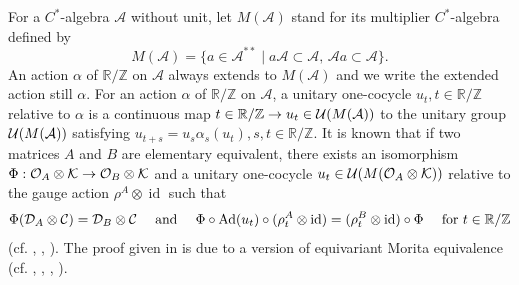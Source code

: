 \documentclass[11pt]{article}
\theoremstyle{plain}
\theoremstyle{definition}
\numberwithin{equation}{section}
\newcommand{\id}{\operatorname{id}}
\newcommand{\Ad}{\operatorname{Ad}}
\newcommand{\RZ}{\mathbb{R}/{\mathbb{Z}}}
\begin{document}
For a $C^*$-algebra $\mathcal{A}$ without unit,
let $M({\mathcal{A}})$ stand for its multiplier $C^*$-algebra
defined by 
\begin{equation*}
M({\mathcal{A}}) = \{ a \in {\mathcal{A}}^{**} 
\mid a {\mathcal{A}} \subset {\mathcal{A}}, \, 
    {\mathcal{A}} a \subset {\mathcal{A}} \}. 
\end{equation*}
An action $\alpha$ of $\RZ$ on $\mathcal{A}$ always extends to 
  $M({\mathcal{A}})$ and we write the extended action still $\alpha$.
For an action $\alpha$ of $\RZ$ on ${\mathcal{A}}$,
a unitary one-cocycle $u_t, t \in \RZ$ relative to $\alpha$
is a continuous map $t \in \RZ \rightarrow u_t \in \U(M({\mathcal{A}}))$
to the unitary group  ${{\mathcal{U}}}(M({\mathcal{A}}))$ 
satisfying
$u_{t+s} = u_s \alpha_s(u_t), s,t \in \RZ$.
It is known that
if two matrices $A$ and $B$ are elementary equivalent,
there exists an isomorphism
$\Phi:{{\mathcal{O}}_A}\otimes{\mathcal{K}} \rightarrow {{\mathcal{O}}_B}\otimes{\mathcal{K}}$ 
and  a unitary one-cocycle
$u_t \in {{\mathcal{U}}}(M({{\mathcal{O}}_A}\otimes{\mathcal{K}}))$ relative to the gauge action
$\rho^{A} \otimes\id$
such that 
\begin{equation*}
\Phi(\SDA) = \SDB
\quad
\text{ and }
\quad
\Phi \circ \Ad(u_t) \circ (\rho^{A}_t\otimes \id)
 = (\rho^{B}_t\otimes\id) \circ \Phi
\quad
\text{ for }
 t \in \RZ
\end{equation*}
(cf. \cite{CK}, \cite{MaETDS2004}, \cite{MPT}).
The proof given in \cite{MaETDS2004}
is due to a version of equivariant Morita equivalence 
(cf. \cite{BGR}, \cite{Combes}, \cite{CKRW}, \cite{RaeWill}).
\end{document}
